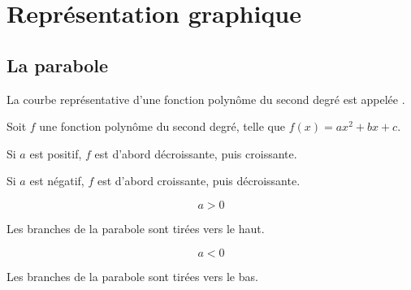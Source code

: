 	\section{Représentation graphique}
	
	\subsection{La parabole}
	
	\begin{bdefi}
		La courbe représentative d'une fonction polynôme du second degré est appelée .
	\end{bdefi}
	
	
	\begin{bprops}
		Soit $f$ une fonction polynôme du second degré, telle que $f(x)=a x^{2}+b x+c$.
		
		\begin{itemProp}
			\item Si $a$ est positif, $f$ est d'abord décroissante, puis croissante.
			\item Si $a$ est négatif, $f$ est d'abord croissante, puis décroissante.
		\end{itemProp}
	\end{bprops}	
	
	\begin{minipage}[c]{0.48\linewidth}
		$$
		a>0
		$$
		
		\begin{center}
		\end{center}
		
		Les branches de la parabole sont tirées vers le haut.
	\end{minipage} \hfill
	\begin{minipage}[c]{0.48\linewidth}
		$$
		a<0
		$$
		
		\begin{center}
		\end{center}
		
		Les branches de la parabole sont tirées vers le bas.
	\end{minipage}
	
